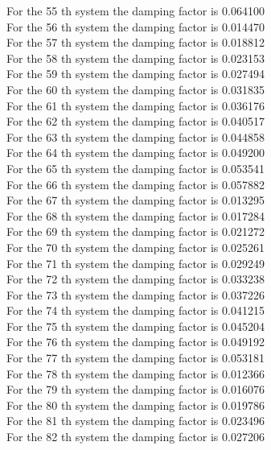 \documentclass[11pt]{article}
\begin{document}
For the 55 th system the damping factor is 0.064100 \\
For the 56 th system the damping factor is 0.014470 \\
For the 57 th system the damping factor is 0.018812 \\
For the 58 th system the damping factor is 0.023153 \\
For the 59 th system the damping factor is 0.027494 \\
For the 60 th system the damping factor is 0.031835 \\
For the 61 th system the damping factor is 0.036176 \\
For the 62 th system the damping factor is 0.040517 \\
For the 63 th system the damping factor is 0.044858 \\
For the 64 th system the damping factor is 0.049200 \\
For the 65 th system the damping factor is 0.053541 \\
For the 66 th system the damping factor is 0.057882 \\
For the 67 th system the damping factor is 0.013295 \\
For the 68 th system the damping factor is 0.017284 \\
For the 69 th system the damping factor is 0.021272 \\
For the 70 th system the damping factor is 0.025261 \\
For the 71 th system the damping factor is 0.029249 \\
For the 72 th system the damping factor is 0.033238 \\
For the 73 th system the damping factor is 0.037226 \\
For the 74 th system the damping factor is 0.041215 \\
For the 75 th system the damping factor is 0.045204 \\
For the 76 th system the damping factor is 0.049192 \\
For the 77 th system the damping factor is 0.053181 \\
For the 78 th system the damping factor is 0.012366 \\
For the 79 th system the damping factor is 0.016076 \\
For the 80 th system the damping factor is 0.019786 \\
For the 81 th system the damping factor is 0.023496 \\
For the 82 th system the damping factor is 0.027206 \\
\end{document}
